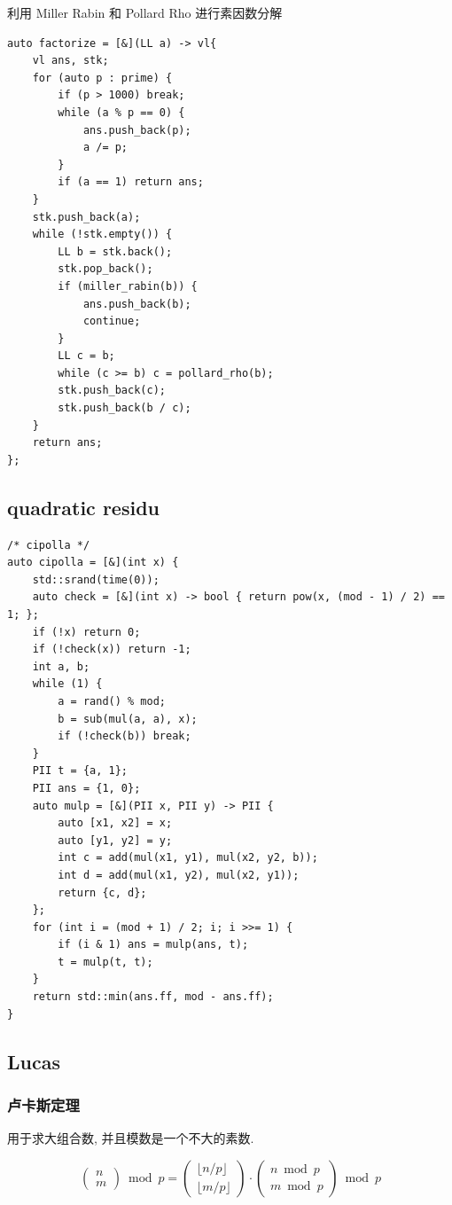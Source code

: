 \documentclass[UTF8, a4paper, titlepage, twoside]{ctexart}
\begin{document}
利用 Miller Rabin 和 Pollard Rho 进行素因数分解

\begin{lstlisting}[style=cpp]
auto factorize = [&](LL a) -> vl{
    vl ans, stk;
    for (auto p : prime) {
        if (p > 1000) break;
        while (a % p == 0) {
            ans.push_back(p);
            a /= p;
        }
        if (a == 1) return ans;
    }
    stk.push_back(a);
    while (!stk.empty()) {
        LL b = stk.back();
        stk.pop_back();
        if (miller_rabin(b)) {
            ans.push_back(b);
            continue;
        }
        LL c = b;
        while (c >= b) c = pollard_rho(b);
        stk.push_back(c);
        stk.push_back(b / c);
    }
    return ans;
};\end{lstlisting}

\subsection{ quadratic residu }

\begin{lstlisting}[style=cpp]
/* cipolla */
auto cipolla = [&](int x) {
    std::srand(time(0));
    auto check = [&](int x) -> bool { return pow(x, (mod - 1) / 2) == 1; };
    if (!x) return 0;
    if (!check(x)) return -1;
    int a, b;
    while (1) {
        a = rand() % mod;
        b = sub(mul(a, a), x);
        if (!check(b)) break;
    }
    PII t = {a, 1};
    PII ans = {1, 0};
    auto mulp = [&](PII x, PII y) -> PII {
        auto [x1, x2] = x;
        auto [y1, y2] = y;
        int c = add(mul(x1, y1), mul(x2, y2, b));
        int d = add(mul(x1, y2), mul(x2, y1));
        return {c, d};
    };
    for (int i = (mod + 1) / 2; i; i >>= 1) {
        if (i & 1) ans = mulp(ans, t);
        t = mulp(t, t);
    }
    return std::min(ans.ff, mod - ans.ff);
}
\end{lstlisting}

\subsection{ Lucas }
\subsubsection*{ 卢卡斯定理 }

用于求大组合数, 并且模数是一个不大的素数.

\[
    \left( \begin{array}{c} n \\ m \end{array} \right) \bmod p
    = \left( \begin{array}{c} \lfloor n / p\rfloor \\ \lfloor m / p\rfloor \end{array} \right)
    \cdot \left( \begin{array}{c} n \bmod p \\ m \bmod p \end{array} \right) \bmod p
\]
\end{document}
